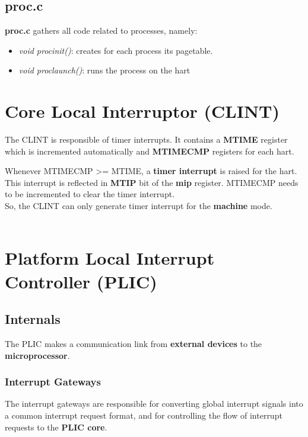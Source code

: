 \documentclass[10pt, a4paper]{article}
\begin{document}
\subsection{proc.c}

\textbf{proc.c} gathers all code related to processes, namely:
\begin{itemize}
\item \textit{void procinit()}: creates for each process its pagetable.
\item \textit{void proclaunch()}: runs the process on the hart
\end{itemize}


\section{Core Local Interruptor (CLINT)}

The CLINT is responsible of timer interrupts. It contains a \textbf{MTIME} register which is incremented automatically and \textbf{MTIMECMP} registers for each hart.

Whenever MTIMECMP >= MTIME, a \textbf{timer interrupt} is raised for the hart. This interrupt is reflected in \textbf{MTIP} bit of the \textbf{mip} register.
MTIMECMP needs to be incremented to clear the timer interrupt.\\

So, the CLINT can only generate timer interrupt for the \textbf{machine} mode.\\

\noindent {}\\
\noindent {}


\section{Platform Local Interrupt Controller (PLIC)}
\subsection{Internals}


The PLIC makes a communication link from \textbf{external devices} to the \textbf{microprocessor}. 

\subsubsection {Interrupt Gateways}
The interrupt gateways are responsible for converting global interrupt signals into a common interrupt request format, and for controlling the flow of interrupt requests to the  \textbf{PLIC core}.
\end{document}
